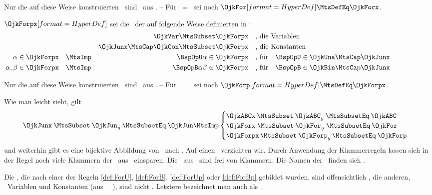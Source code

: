 Nur die auf diese Weise konstruierten \Formeln\ sind \Elemente\ aus \OjkForx.
-- Für \OjkJunx\ = \OjkJun\ sei noch $\defSym{\OjkFor} \MtsDefEq \OjkForx$.

$\defSym{\OjkForpx}$ sei die \Menge\ der auf folgende Weise definierten  in :
\begin{align}
&                          & \OjkVar                   \MtsSubset \OjkForpx
&&& \text{, die Variablen}  \label{def:ForQp}
\\
&                          & \OjkJunx \MtsCap \OjkCon   \MtsSubset \OjkForpx
&&& \text{, die Konstanten} \label{def:ForJKp}
\\
\alpha      \in\OjkForpx & \quad\MtsImp & \BspOpU\alpha \in\OjkForpx
&&& \text{, für}  \quad \BspOpU \in \OjkUna  \MtsCap \OjkJunx
\label{def:ForUp}
\\
\alpha,\beta\in\OjkForpx & \quad\MtsImp & \BspOpB\alpha\beta\in\OjkForpx
&&& \text{, für}  \quad \BspOpB  \in \OjkBin  \MtsCap \OjkJunx
\label{def:ForBp} \formulatoleft
\end{align}

Nur die auf diese Weise konstruierten \Formeln\ sind \Elemente\ aus \OjkForpx.
-- Für \OjkJunx\ = \OjkJun\ sei noch $\defSym{\OjkForp} \MtsDefEq \OjkForpx$.

Wie man leicht sieht, gilt
\begin{equation}
\OjkJunx      \: \MtsSubset \: \OjkJun_y  \: \MtsSubsetEq \: \OjkJun \MtsImp
\begin{cases}
\OjkABCx  \: \MtsSubset \: \OjkABC_y  \: \MtsSubsetEq \: \OjkABC \\
\OjkForx  \; \MtsSubset \: \OjkFor_y  \; \MtsSubsetEq \: \OjkFor \\
\OjkForpx \, \MtsSubset \: \OjkForp_y \, \MtsSubsetEq \: \OjkForp
\end{cases}
\end{equation}
und weiterhin gibt es eine bijektive Abbildung von \OjkFor\ nach \OjkForp. Auf einen \Beweis\ verzichten wir.
%
Durch Anwendung der Klammerregeln  lassen sich in der Regel noch viele Klammern der \Formeln\ aus \OjkForx\ einsparen.
Die \Formeln\ aus \OjkForpx\ sind frei von Klammern.
Die Namen der \Junktoren\ finden sich .

Die \Formeln, die nach einer der Regeln \eqref{def:ForU}, \eqref{def:ForB}, \eqref{def:ForUp} oder \eqref{def:ForBp} gebildet wurden, sind offensichtlich \zerlegbar, die anderen, \textdh\ Variablen und Konstanten (aus \OjkVar\ \textbzw\ \OjkCon), sind nicht \zerlegbar. Letztere bezeichnet man auch als .

